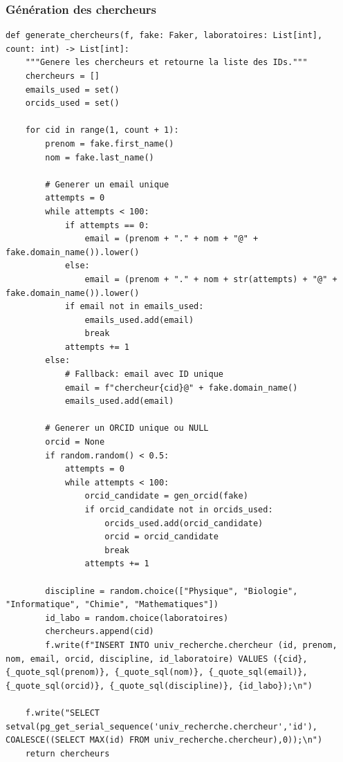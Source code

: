 \documentclass[12pt,a4paper]{article}
\begin{document}
\subsubsection{Génération des chercheurs}
\begin{lstlisting}[style=pythonstyle, caption=Exemple de génération des chercheurs]
def generate_chercheurs(f, fake: Faker, laboratoires: List[int], count: int) -> List[int]:
    """Genere les chercheurs et retourne la liste des IDs."""
    chercheurs = []
    emails_used = set()
    orcids_used = set()
    
    for cid in range(1, count + 1):
        prenom = fake.first_name()
        nom = fake.last_name()
        
        # Generer un email unique
        attempts = 0
        while attempts < 100:
            if attempts == 0:
                email = (prenom + "." + nom + "@" + fake.domain_name()).lower()
            else:
                email = (prenom + "." + nom + str(attempts) + "@" + fake.domain_name()).lower()
            if email not in emails_used:
                emails_used.add(email)
                break
            attempts += 1
        else:
            # Fallback: email avec ID unique
            email = f"chercheur{cid}@" + fake.domain_name()
            emails_used.add(email)
        
        # Generer un ORCID unique ou NULL
        orcid = None
        if random.random() < 0.5:
            attempts = 0
            while attempts < 100:
                orcid_candidate = gen_orcid(fake)
                if orcid_candidate not in orcids_used:
                    orcids_used.add(orcid_candidate)
                    orcid = orcid_candidate
                    break
                attempts += 1
        
        discipline = random.choice(["Physique", "Biologie", "Informatique", "Chimie", "Mathematiques"])
        id_labo = random.choice(laboratoires)
        chercheurs.append(cid)
        f.write(f"INSERT INTO univ_recherche.chercheur (id, prenom, nom, email, orcid, discipline, id_laboratoire) VALUES ({cid}, {_quote_sql(prenom)}, {_quote_sql(nom)}, {_quote_sql(email)}, {_quote_sql(orcid)}, {_quote_sql(discipline)}, {id_labo});\n")
    
    f.write("SELECT setval(pg_get_serial_sequence('univ_recherche.chercheur','id'), COALESCE((SELECT MAX(id) FROM univ_recherche.chercheur),0));\n")
    return chercheurs
\end{lstlisting}

\newpage
\end{document}
